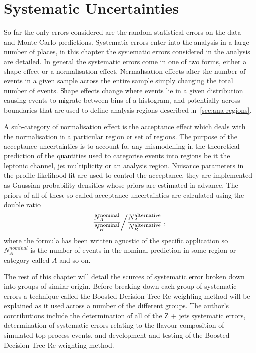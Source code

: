 \chapter{Systematic Uncertainties}%
\label{ch:systematics}

So far the only errors considered are the random statistical errors on the data
and Monte-Carlo predictions. Systematic errors enter into the analysis in a
large number of places, in this chapter the systematic errors considered in the
analysis are detailed. In general the systematic errors come in one of two
forms, either a shape effect or a normalisation effect. Normalisation effects
alter the number of events in a given sample across the entire sample simply
changing the total number of events. Shape effects change where events lie in a
given distribution causing events to migrate between bins of a histogram, and
potentially across boundaries that are used to define analysis regions described
in~\ref{sec:ana-regions}.

A sub-category of normalisation effect is the acceptance effect which deals with
the normalisation in a particular region or set of regions. The purpose of the
acceptance uncertainties is to account for any mismodelling in the theoretical
prediction of the quantities used to categorise events into regions be it the
leptonic channel, jet multiplicity or an analysis region. Nuisance parameters in
the profile likelihood fit are used to control the acceptance, they are
implemented as Gaussian probability densities whose priors are estimated in
advance. The priors of all of these so called acceptance uncertainties are
calculated using the double ratio
\begin{equation}
  \left. \dfrac{N_{A}^{\text{nominal}}}{N_{B}^{\text{nominal}}} \middle/ \dfrac{N_{A}^{\text{alternative}}}{N_{B}^{\text{alternative}}} \right.,
  \label{eq:acceptance-dr}
\end{equation}
where the formula has been written agnostic of the specific application so
$N_{A}^{nominal}$ is the number of events in the nominal prediction in some
region or category called $A$ and so on. 

The rest of this chapter will detail the sources of systematic error broken down
into groups of similar origin. Before breaking down each group of systematic
errors a technique called the Boosted Decision Tree Re-weighting method will be
explained as it used across a number of the different groups. The author's
contributions include the determination of all of the Z + jets systematic
errors, determination of systematic errors relating to the flavour composition
of simulated top process events, and development and testing of the Boosted
Decision Tree Re-weighting method.

